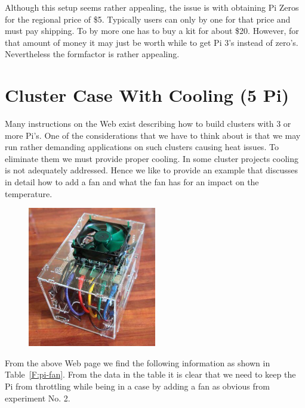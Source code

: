 Although this setup seems rather appealing, the issue is with obtaining
Pi Zeros for the regional price of \$5. Typically users can only by one
for that price and must pay shipping. To by more one has to buy a kit
for about \$20. However, for that amount of money it may just be worth
while to get Pi 3's instead of zero's. Nevertheless the formfactor is
rather appealing.

\section{Cluster Case With Cooling (5 Pi)}\label{S:cluster-case-with-cooling-5-pi}

Many instructions on the Web exist describing how to build clusters with
3 or more Pi's. One of the considerations that we have to think about is
that we may run rather demanding applications on such clusters causing
heat issues. To eliminate them we must provide proper cooling. In some
cluster projects cooling is not adequately addressed. Hence we like to
provide an example that discusses in detail how to add a fan and what the
fan has for an impact on the temperature.

\begin{figure}
\centering
\includegraphics[width=0.5\textwidth]{images/IMG16_6273_sweb.jpg}
\caption{}
\end{figure}





From the above Web page we find the following information as shown in
Table~\ref{F:pi-fan}. From the data in the table it is clear that we
need to keep the Pi from throttling while being in a case by adding a
fan as obvious from experiment No. 2.



